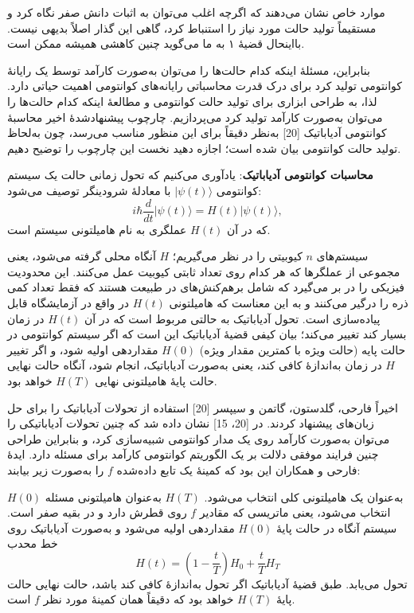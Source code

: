 موارد خاص نشان می‌دهند که اگرچه اغلب می‌توان به اثبات دانش صفر نگاه کرد و مستقیماً تولید حالت مورد نیاز را استنباط کرد، گاهی این گذار اصلاً بدیهی نیست. بااینحال قضیهٔ ۱ به ما می‌گوید چنین کاهشی همیشه ممکن است.

بنابراین، مسئلهٔ اینکه کدام حالت‌ها را می‌توان به‌صورت کارآمد توسط یک رایانهٔ کوانتومی تولید کرد  برای درک قدرت محاسباتی رایانه‌های کوانتومی اهمیت حیاتی دارد. لذا، به طراحی ابزاری برای تولید حالت کوانتومی و مطالعهٔ اینکه کدام حالت‌ها را می‌توان به‌صورت کارآمد تولید کرد می‌پردازیم. چارچوب پیشنهادشدهٔ اخیر محاسبهٔ کوانتومی آدیاباتیک [20] به‌نظر دقیقاً برای این منظور مناسب می‌رسد، چون به‌لحاظ تولید حالت کوانتومی بیان شده است؛ اجازه دهید نخست این چارچوب را توضیح دهیم.

\textbf{محاسبات کوانتومی آدیاباتیک}:
یادآوری می‌کنیم که تحول زمانی حالت یک سیستم کوانتومی $|\psi(t)\rangle$ با معادلهٔ شرودینگر توصیف می‌شود:
\begin{equation}
	i\hbar \frac{d}{dt}|\psi(t)\rangle = H(t)|\psi(t)\rangle,
\end{equation}
که در آن $H(t)$ عملگری به نام هامیلتونی سیستم است.

\noindent
سیستم‌های $n$ کیوبیتی را در نظر می‌گیریم؛ 
$H$
آنگاه محلی گرفته می‌شود، یعنی مجموعی از عملگرها که هر کدام روی تعداد ثابتی کیوبیت عمل می‌کنند. 
این محدودیت فیزیکی را در بر می‌گیرد که شامل برهم‌کنش‌های در طبیعت هستند که فقط تعداد کمی ذره را درگیر می‌کنند و به این معناست که هامیلتونی $H(t)$ در واقع در آزمایشگاه قابل پیاده‌سازی است. تحول آدیاباتیک به حالتی مربوط است که در آن $H(t)$ در زمان بسیار کند تغییر می‌کند؛ بیان کیفی قضیهٔ آدیاباتیک این است که اگر سیستم کوانتومی در حالت پایه (حالت ویژه‌ با کمترین مقدار ویژه‌) $H(0)$ مقداردهی اولیه شود، و اگر تغییر $H$ در زمان به‌اندازهٔ کافی کند، یعنی به‌صورت آدیاباتیک، انجام شود، آنگاه حالت نهایی حالت پایهٔ هامیلتونی نهایی $H(T)$ خواهد بود.

اخیراً فارحی، گلدستون، گاتمن و سیپسر [20] استفاده از تحولات آدیاباتیک را برای حل زبان‌های
پیشنهاد کردند. در [20، 15] نشان داده شد که چنین تحولات آدیاباتیکی را می‌توان به‌صورت کارآمد روی یک مدار کوانتومی شبیه‌سازی کرد، و بنابراین طراحی چنین فرایند موفقی دلالت بر یک الگوریتم کوانتومی کارآمد برای مسئله دارد. ایدهٔ فارحی و همکاران این بود که کمینهٔ یک تابع داده‌شده $f$ را به‌صورت زیر بیابند: 

$H(0)$ به‌عنوان یک هامیلتونی کلی انتخاب می‌شود. $H(T)$ به‌عنوان هامیلتونی مسئله انتخاب می‌شود، یعنی ماتریسی که مقادیر $f$ روی قطرش دارد و در بقیه صفر است. سیستم آنگاه در حالت پایهٔ $H(0)$ مقداردهی 
اولیه می‌شود و به‌صورت آدیاباتیک روی خط محدب 
$$H(t) = (1 - \frac{t}{T})H_0 + \frac{t}{T}H_T$$
تحول می‌یابد. طبق قضیهٔ آدیاباتیک اگر تحول به‌اندازهٔ کافی کند باشد، حالت نهایی حالت پایهٔ $H(T)$ خواهد بود که دقیقاً همان کمینهٔ مورد نظر $f$ است.

